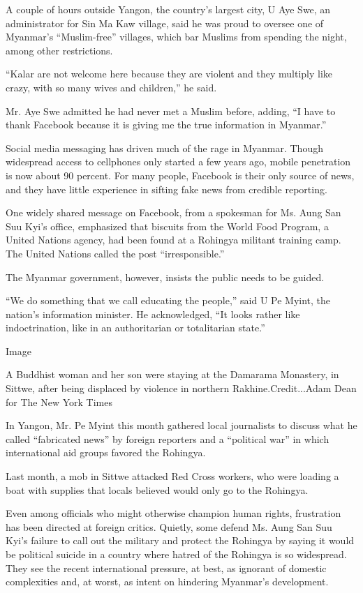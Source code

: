 A couple of hours outside Yangon, the country's largest city, U Aye Swe,
an administrator for Sin Ma Kaw village, said he was proud to oversee
one of Myanmar's ``Muslim-free'' villages, which bar Muslims from
spending the night, among other restrictions.

``Kalar are not welcome here because they are violent and they multiply
like crazy, with so many wives and children,'' he said.

Mr. Aye Swe admitted he had never met a Muslim before, adding, ``I have
to thank Facebook because it is giving me the true information in
Myanmar.''

Social media messaging has driven much of the rage in Myanmar. Though
widespread access to cellphones only started a few years ago, mobile
penetration is now about 90 percent. For many people, Facebook is their
only source of news, and they have little experience in sifting fake
news from credible reporting.

One widely shared message on Facebook, from a spokesman for Ms. Aung San
Suu Kyi's office, emphasized that biscuits from the World Food Program,
a United Nations agency, had been found at a Rohingya militant training
camp. The United Nations called the post ``irresponsible.''

The Myanmar government, however, insists the public needs to be guided.

``We do something that we call educating the people,'' said U Pe Myint,
the nation's information minister. He acknowledged, ``It looks rather
like indoctrination, like in an authoritarian or totalitarian state.''

Image

A Buddhist woman and her son were staying at the Damarama Monastery, in
Sittwe, after being displaced by violence in northern
Rakhine.Credit...Adam Dean for The New York Times

In Yangon, Mr. Pe Myint this month gathered local journalists to discuss
what he called ``fabricated news'' by foreign reporters and a
``political war'' in which international aid groups favored the
Rohingya.

Last month, a mob in Sittwe attacked Red Cross workers, who were loading
a boat with supplies that locals believed would only go to the Rohingya.

Even among officials who might otherwise champion human rights,
frustration has been directed at foreign critics. Quietly, some defend
Ms. Aung San Suu Kyi's failure to call out the military and protect the
Rohingya by saying it would be political suicide in a country where
hatred of the Rohingya is so widespread. They see the recent
international pressure, at best, as ignorant of domestic complexities
and, at worst, as intent on hindering Myanmar's development.

